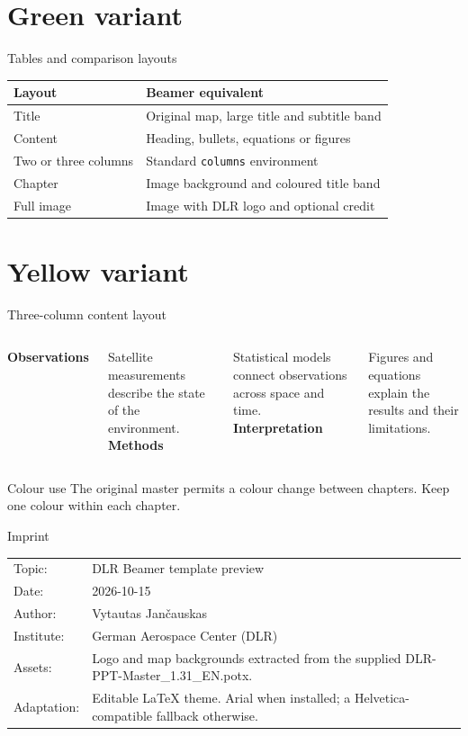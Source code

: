 \documentclass[aspectratio=169,11pt]{beamer}
\begin{document}
\section{Green variant}
\begin{frame}[t]{Tables and comparison layouts}
\renewcommand{\arraystretch}{1.4}
\begin{tabular}{@{}p{39mm}p{88mm}@{}}\toprule
\textbf{Layout} & \textbf{Beamer equivalent}\\\midrule
Title & Original map, large title and subtitle band\\
Content & Heading, bullets, equations or figures\\
Two or three columns & Standard \texttt{columns} environment\\
Chapter & Image background and coloured title band\\
Full image & Image with DLR logo and optional credit\\\bottomrule
\end{tabular}
\end{frame}
\section{Yellow variant}
\begin{frame}[t]{Three-column content layout}
\begin{columns}[T,onlytextwidth]
\textbf{Observations}\par\medskip
Satellite measurements describe the state of the environment.
\textbf{Methods}\par\medskip
Statistical models connect observations across space and time.
\textbf{Interpretation}\par\medskip
Figures and equations explain the results and their limitations.
\end{columns}
\vspace{9mm}
\begin{block}{Colour use}
The original master permits a colour change between chapters. Keep one colour within each chapter.
\end{block}
\end{frame}
\begin{frame}[t]{Imprint}
\begin{tabular}{@{}p{23mm}p{107mm}@{}}
Topic: & DLR Beamer template preview\\[3mm]
Date: & 2026-10-15\\[3mm]
Author: & Vytautas Jančauskas\\[3mm]
Institute: & German Aerospace Center (DLR)\\[3mm]
Assets: & Logo and map backgrounds extracted from the supplied DLR-PPT-Master\_1.31\_EN.potx.\\[3mm]
Adaptation: & Editable LaTeX theme. Arial when installed; a Helvetica-compatible fallback otherwise.\\
\end{tabular}
\end{frame}
\end{document}
